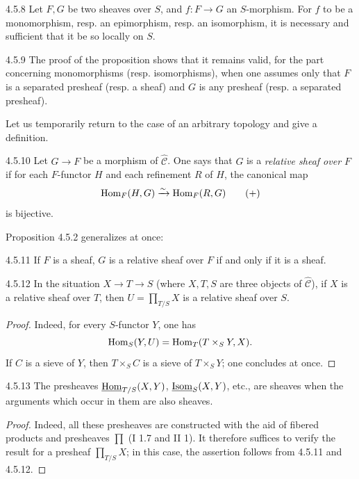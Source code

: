 \begin{corollary}{4.5.8}\label{IV.4.5.8}
Let \(F,G\) be two sheaves over \(S\), and \(f:F\to G\)
an \(S\)-morphism. For \(f\) to be a monomorphism, resp.
an epimorphism, resp. an isomorphism, it is necessary and
sufficient that it be so locally on \(S\).
\end{corollary}
\begin{remark}{4.5.9}\label{IV.4.5.9}
The proof of the proposition shows that it remains valid,
for the part concerning monomorphisms (resp. isomorphisms),
when one assumes only that \(F\) is a separated presheaf
(resp. a sheaf) and \(G\) is any presheaf
(resp. a separated presheaf).
\end{remark}
Let us temporarily return to the case of an arbitrary topology
and give a definition.
\begin{definition}{4.5.10}\label{IV.4.5.10}
Let \(G\to F\) be a morphism of \(\widehat{\mathcal C}\).
One says that \(G\) is a \emph{relative sheaf over \(F\)} if
for each \(F\)-functor \(H\) and each refinement \(R\) of \(H\),
the canonical map
\[
\operatorname{Hom}_F(H,G)\xrightarrow{\sim}\operatorname{Hom}_F(R,G)\tag{+}
\]
is bijective.
\end{definition}
Proposition 4.5.2 generalizes at once:
\begin{proposition}{4.5.11}\label{IV.4.5.11}
If \(F\) is a sheaf, \(G\) is a relative sheaf over \(F\)
if and only if it is a sheaf.
\end{proposition}
\begin{lemma}{4.5.12}\label{IV.4.5.12}
In the situation \(X\to T\to S\) (where \(X,T,S\) are three
objects of \(\widehat{\mathcal C}\)), if \(X\) is a relative
sheaf over \(T\), then \(U=\prod_{T/S}X\) is a relative sheaf over \(S\).
\end{lemma}
\begin{proof}
Indeed, for every \(S\)-functor \(Y\), one has
\[
\operatorname{Hom}_S(Y,U)=\operatorname{Hom}_T(T\times_S Y,X).
\]
If \(C\) is a sieve of \(Y\), then \(T\times_S C\) is a sieve
of \(T\times_S Y\); one concludes at once.
\end{proof}
\begin{corollary}{4.5.13}\label{IV.4.5.13}
The presheaves \(\underline{\operatorname{Hom}}_{T/S}(X,Y)\),
\(\underline{\operatorname{Isom}}_S(X,Y)\), etc., are sheaves when the
arguments which occur in them are also sheaves.
\end{corollary}
\begin{proof}
Indeed, all these presheaves are constructed with the aid of
fibered products and presheaves \(\prod\) (I 1.7 and II 1).
It therefore suffices to verify the result for a presheaf
\(\prod_{T/S}X\); in this case, the assertion follows from
4.5.11 and 4.5.12.
\end{proof}


